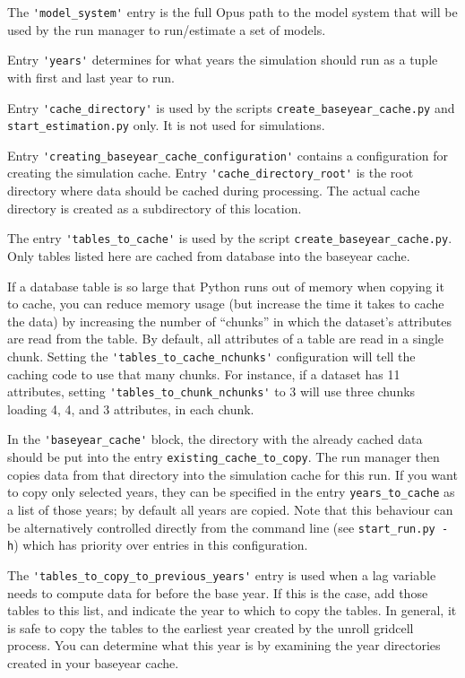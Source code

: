 The \verb|'model_system'| entry is the full Opus path to the model system that
will be used by the run manager to run/estimate a set of models.

Entry \verb|'years'| determines for what
years the simulation should run as a tuple with first and last year to run.

Entry \verb|'cache_directory'| is used by the scripts \verb|create_baseyear_cache.py| and 
\verb|start_estimation.py| only. It is not used for simulations.

Entry \verb|'creating_baseyear_cache_configuration'| contains a configuration
for creating the simulation cache. Entry \verb|'cache_directory_root'| is the root 
directory where data should be
cached during processing. The actual cache directory is created as a subdirectory
of this location. 

The entry \verb|'tables_to_cache'| is used by the script \verb|create_baseyear_cache.py|. 
Only tables listed here are cached from database into the baseyear cache.

If a database table is so large that Python runs out of memory when copying it
to cache, you can reduce memory usage (but increase the time it takes to cache
the data) by increasing the number of ``chunks'' in which the dataset's 
attributes are read from the table.  By
default, all attributes of a table are read in a single chunk. Setting the
\verb|'tables_to_cache_nchunks'| configuration  will tell the caching code
to use that many chunks.  For instance, if a dataset has 11 attributes, setting
\verb|'tables_to_chunk_nchunks'| to 3 will use three chunks loading 4, 4, and 3
attributes, in each chunk.

In the \verb|'baseyear_cache'| block, the directory with the already cached data
should be put into the entry \verb|existing_cache_to_copy|. The run manager then
copies data from that directory into the simulation cache for this run. If you
want to copy only selected years, they can be specified in the entry
\verb|years_to_cache| as a list of those years; by default all years are
copied. Note that this behaviour can be alternatively controlled directly from
the command line (see \verb|start_run.py -h|)
which has priority over entries in this configuration.

The \verb|'tables_to_copy_to_previous_years'| entry is used when a
lag variable needs to compute data for before the base year.  
If this is the case, add those
tables to this list, and indicate the year to which
to copy the tables.  In general, it is safe to copy the tables to the earliest
year created by the unroll gridcell process.  You can determine what this year
is by examining the year directories created in your baseyear cache.


